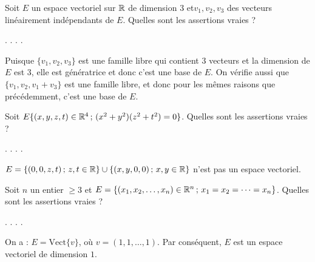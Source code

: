 \begin{question}
Soit $E$ un espace vectoriel sur $\mathbb{R}$ de dimension $3$ et$v_1,v_2,v_3$ des vecteurs linéairement indépendants de $E$.
Quelles sont les assertions vraies ?
\begin{answers}  
.
.
.
.
\end{answers}
\begin{explanations} Puisque $\{v_1,v_2,v_3\}$  est une famille libre qui contient $3$ vecteurs et la dimension de $E$ est $3$, 
elle est génératrice et donc c'est une base de $E$.
\vskip2mm
On vérifie aussi que $\{v_1,v_2,v_1+v_3\}$ est une famille libre, 
et donc pour les mêmes raisons que précédemment, c'est une base de $E$.
\end{explanations}
\end{question}

\begin{question}
Soit $E \{(x,y,z,t) \in \mathbb{R}^4 \, ; \, (x^2+y^2)(z^2+t^2)=0\}$. Quelles sont les assertions vraies ?
\begin{answers}  
.
.
.
.
\end{answers}
\begin{explanations} $E =\{(0,0,z,t)  \, ; \, z,t \in \mathbb{R}\} \cup \{(x,y,0,0)  \, ; \, x,y \in \mathbb{R}\}$ n'est pas un espace vectoriel.
\end{explanations}
\end{question}

\begin{question}
Soit $n$ un entier $\ge 3$ et $E=\{(x_1,x_2, \dots , x_n) \in \mathbb{R}^n \, ; \, x_1=x_2=\dots =x_n\}$. Quelles sont les assertions vraies ?
\begin{answers}  
.
.
.
.
\end{answers}
\begin{explanations} On a : $E=\mbox{Vect}\{v\}$, où $ v=(1,1, \dots ,1)$. Par conséquent, $E$ est un espace vectoriel de dimension $1$.
\end{explanations}
\end{question}

